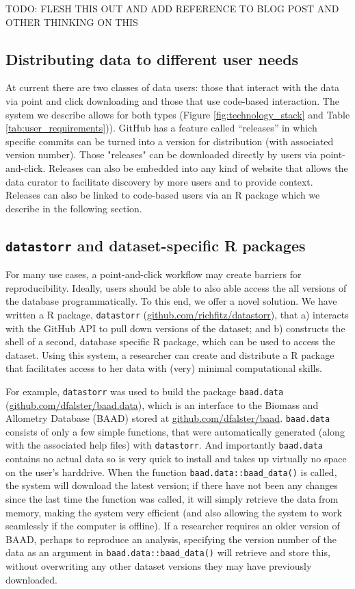 \documentclass[a4paper,11pt]{article}
\newcommand{\smurl}[1]{{\footnotesize\url{#1}}}
\begin{document}
TODO: FLESH THIS OUT AND ADD REFERENCE TO BLOG POST AND OTHER THINKING ON THIS


\subsection{Distributing data to different user needs}

At current there are two classes of data users: those that  interact with the data via point and click downloading and those that use code-based interaction.  The system we describe allows for both types (Figure \ref{fig:technology_stack} and Table \ref{tab:user_requirements})).  GitHub has a feature called ``releases'' in which specific commits can be turned into a version for distribution (with associated version number).  Those "releases" can be downloaded directly by users via point-and-click.  Releases can also be embedded into any kind of website that allows the data curator to facilitate discovery by more users and to provide context.  Releases can also be linked to code-based users via an R package which we describe in the following section.  

\subsection{\texttt{datastorr} and dataset-specific R packages}

For many use cases, a point-and-click workflow may create barriers for reproducibility. Ideally, users should be able to also able access the all versions of the database programmatically. To this end, we offer a novel solution. We have written a R package, \texttt{datastorr} (\smurl{github.com/richfitz/datastorr}), that a) interacts with the GitHub API to pull down versions of the dataset; and b) constructs the shell of a second, database specific R package, which can be used to access the dataset. Using this system, a researcher can create and distribute a R package that facilitates access to her data with (very) minimal computational skills.

For example, \texttt{datastorr} was used to build the package \texttt{baad.data} (\smurl{github.com/dfalster/baad.data}), which is an interface to the Biomass and Allometry Database (BAAD) stored at \smurl{github.com/dfalster/baad}. \texttt{baad.data} consists of only a few simple functions, that were automatically generated (along with the associated help files) with \texttt{datastorr}. And importantly \texttt{baad.data} contains no actual data so is very quick to install and takes up virtually no space on the user's harddrive. When the function \texttt{baad.data::baad\_data()} is called, the system will download the latest version; if there have not been any changes since the last time the function was called, it will simply retrieve the data from memory, making the system very efficient (and also allowing the system to work seamlessly if the computer is offline). If a researcher requires an older version of BAAD, perhaps to reproduce an analysis, specifying the version number of the data as an argument in \texttt{baad.data::baad\_data()} will retrieve and store this, without overwriting any other dataset versions they may have previously downloaded.
\end{document}
